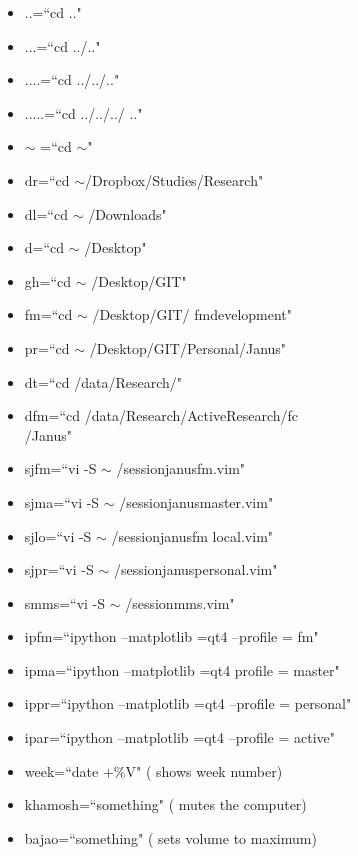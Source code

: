 \documentclass[twoside,a4paper]{article}
\newcommand{\tcb}{\color{blue}}
\newcommand{\tcr}{\color{red}}
\newcommand{\tcg}{\color{gray}}
\newcommand{\tck}{\color{black}}
\begin{document}
\begin{itemize}
    \item \tcr ..\tck =\tcb ``cd .."
    \item \tcr ...\tck =\tcb ``cd ../.."
    \item \tcr ....\tck =\tcb ``cd ../../.."
    \item \tcr .....\tck =\tcb ``cd ../../../
          .."
    \item \tcr $\sim$ \tck =\tcb ``cd $\sim$"
    \item \tcr dr\tck =\tcb ``cd
          $\sim$/Dropbox/Studies/Research"
    \item \tcr dl\tck =\tcb ``cd $\sim$
          /Downloads"
    \item \tcr d\tck =\tcb ``cd $\sim$
          /Desktop"
    \item \tcr gh\tck =\tcb ``cd $\sim$
          /Desktop/GIT"
    \item \tcr fm\tck =\tcb ``cd $\sim$
          /Desktop/GIT/
          fm\textunderscore development"
    \item \tcr pr\tck =\tcb ``cd $\sim$
          /Desktop/GIT/Personal/Janus"
    \item \tcr dt\tck =\tcb ``cd
          /data/Research/"
    \item \tcr dfm\tck =\tcb ``cd
          /data/Research/Active\textunderscore Research/fc \\
          /Janus"
    \item \tcr sjfm\tck =\tcb ``vi -S $\sim$
          /session\textunderscore janus\textunderscore fm.vim"
    \item \tcr sjma\tck =\tcb ``vi -S $\sim$
          /session\textunderscore janus\textunderscore master.vim"
    \item \tcr sjlo\tck =\tcb ``vi -S $\sim$
          /session\textunderscore janus\textunderscore fm\textunderscore
          local.vim"
    \item \tcr sjpr\tck =\tcb ``vi -S $\sim$
          /session\textunderscore janus\textunderscore personal.vim"
    \item \tcr smms\tck =\tcb ``vi -S $\sim$
          /session\textunderscore mms.vim"
    \item \tcr ipfm\tck =\tcb ``ipython
          --matplotlib =qt4 --profile = fm"
    \item \tcr ipma\tck =\tcb ``ipython
          --matplotlib =qt4 profile = master"
    \item \tcr ippr\tck =\tcb ``ipython
          --matplotlib =qt4 --profile = personal"
    \item \tcr ipar\tck =\tcb ``ipython
          --matplotlib =qt4 --profile = active"
    \item \tcr week\tck =\tcb ``date +$\%$V"
          \tcg  ( shows week number)
    \item \tcr khamosh\tck =\tcb ``something"
          \tcg  ( mutes the computer)
    \item \tcr bajao\tck =\tcb ``something"
          \tcg  ( sets volume to maximum)
\end{itemize}
\vfill \eject
\end{document}
